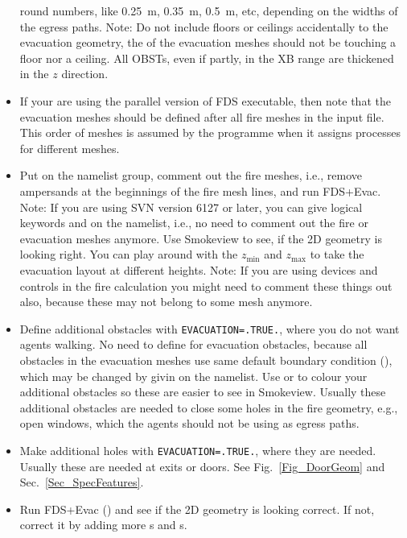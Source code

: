\documentclass[12pt,a4paper,final,twoside]{stylevk}
\begin{document}
\begin{itemize}
  round numbers, like 0.25~m, 0.35~m, 0.5~m, etc, depending on
  the widths of the egress paths.  Note: Do not include floors or
  ceilings accidentally to the evacuation geometry, the  of
  the evacuation meshes should not be touching a floor nor a ceiling.
  All OBSTs, even if partly, in the XB range are thickened in the $z$
  direction.
%
\item If your are using the parallel version of FDS executable, then
  note that the evacuation meshes should be defined after all fire
  meshes in the input file.  This order of meshes is assumed by the
  programme when it assigns processes for different meshes.
%
\item Put  on the  namelist group,
  comment out the fire meshes, i.e., remove ampersands at the
  beginnings of the fire mesh lines, and run FDS+Evac.  Note: If you
  are using SVN version 6127 or later, you can give logical keywords
   and  on the
   namelist, i.e., no need to comment out the fire
  or evacuation meshes anymore.  Use Smokeview to see, if the 2D
  geometry is looking right.  You can play around with the
  $z_\mathrm{min}$ and $z_\mathrm{max}$ to take the evacuation layout
  at different heights.  Note: If you are using devices and controls
  in the fire calculation you might need to comment these things out
  also, because these may not belong to some mesh anymore.
%
\item Define additional obstacles with \verb|EVACUATION=.TRUE.|, where
  you do not want agents walking.  No need to define 
  for evacuation obstacles, because all obstacles in the evacuation
  meshes use same default boundary condition (), which
  may be changed by givin  on the
   namelist.  Use  or  to colour
  your additional obstacles so these are easier to see in Smokeview.
  Usually these additional obstacles are needed to close some holes in
  the fire geometry, e.g., open windows, which the agents should
  not be using as egress paths.
%
\item Make additional holes with \verb|EVACUATION=.TRUE.|, where they
  are needed.  Usually these are needed at exits or doors.  See
  Fig.~\ref{Fig_DoorGeom} and Sec.~\ref{Sec_SpecFeatures}.
%
\item Run FDS+Evac () and see if the 2D geometry is
  looking correct.  If not, correct it by adding more s
  and s.

\end{itemize}
\end{document}
